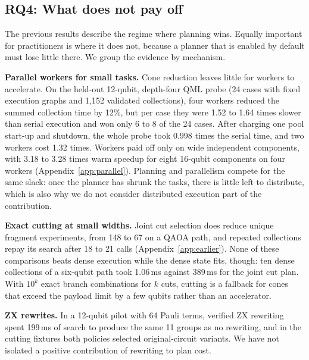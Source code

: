 \subsection{RQ4: What does not pay off}
\label{sec:rq4}
The previous results describe the regime where planning wins. Equally important for practitioners is where it does not, because a planner that is enabled by default must lose little there. We group the evidence by mechanism.

\textbf{Parallel workers for small tasks.} Cone reduction leaves little for workers to accelerate. On the held-out 12-qubit, depth-four QML probe (24 cases with fixed execution graphs and 1,152 validated collections), four workers reduced the summed collection time by 12\%, but per case they were 1.52 to 1.64 times slower than serial execution and won only 6 to 8 of the 24 cases. After charging one pool start-up and shutdown, the whole probe took 0.998 times the serial time, and two workers cost 1.32 times. Workers paid off only on wide independent components, with 3.18 to 3.28 times warm speedup for eight 16-qubit components on four workers (Appendix~\ref{app:parallel}). Planning and parallelism compete for the same slack: once the planner has shrunk the tasks, there is little left to distribute, which is also why we do not consider distributed execution part of the contribution.

\textbf{Exact cutting at small widths.} Joint cut selection does reduce unique fragment experiments, from 148 to 67 on a QAOA path, and repeated collections repay its search after 18 to 21 calls (Appendix~\ref{app:earlier}). None of these comparisons beats dense execution while the dense state fits, though: ten dense collections of a six-qubit path took 1.06\,ms against 389\,ms for the joint cut plan. With $10^k$ exact branch combinations for $k$ cuts, cutting is a fallback for cones that exceed the payload limit by a few qubits rather than an accelerator.

\textbf{ZX rewrites.} In a 12-qubit pilot with 64 Pauli terms, verified ZX rewriting spent 199\,ms of search to produce the same 11 groups as no rewriting, and in the cutting fixtures both policies selected original-circuit variants. We have not isolated a positive contribution of rewriting to plan cost.

